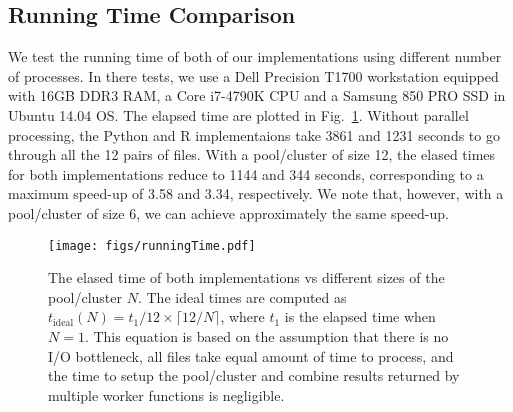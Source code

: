 \documentclass{article}
\begin{document}
\subsection{Running Time Comparison}
We test the running time of both of our implementations using different number
of processes. In there tests, we use a Dell Precision T1700 workstation equipped
with 16GB DDR3 RAM, a Core i7-4790K CPU and a Samsung 850 PRO SSD in Ubuntu
14.04 OS. The elapsed time are plotted in Fig.~\ref{fig:running_time}. Without
parallel processing, the Python and R implementaions take 3861 and 1231 seconds
to go through all the 12 pairs of files. With a pool/cluster of size 12, the
elased times for both implementations reduce to 1144 and 344 seconds,
corresponding to a maximum speed-up of 3.58 and 3.34, respectively. We note
that, however, with a pool/cluster of size 6, we can achieve approximately the
same speed-up.

\begin{figure}[h]
    \centering
    \texttt{[image: figs/runningTime.pdf]}
    \caption{The elased time of both implementations vs different sizes of the
    pool/cluster $N$. The ideal times are computed as $t_{\mbox{ideal}}(N) =
    t_1/12 \times \lceil12 / N\rceil$, where $t_1$ is the elapsed time when
    $N = 1$. This equation is based on the assumption that there is no I/O
    bottleneck, all files take equal amount of time to process, and the time to
    setup the pool/cluster and combine results returned by multiple worker
    functions is negligible.}
    \label{fig:running_time}
\end{figure}
\end{document}
